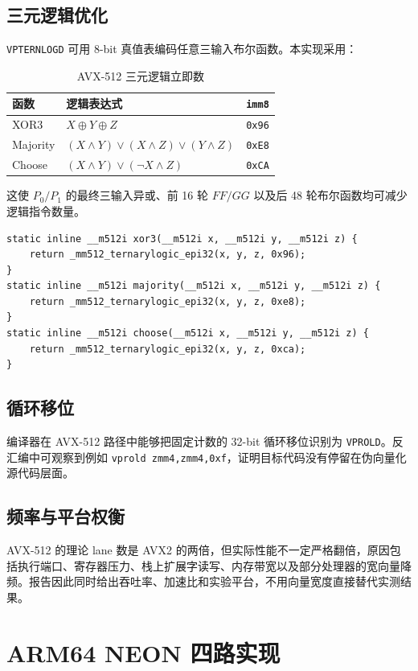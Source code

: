 \documentclass[UTF8,a4paper,12pt]{ctexart}
\newcommand{\code}[1]{\texttt{#1}}
\begin{document}
\subsection{三元逻辑优化}
\code{VPTERNLOGD} 可用 8-bit 真值表编码任意三输入布尔函数。本实现采用：
\begin{table}[H]
\centering
\caption{AVX-512 三元逻辑立即数}
\begin{tabular}{lll}
\toprule
函数 & 逻辑表达式 & \code{imm8} \\
\midrule
XOR3 & $X\oplus Y\oplus Z$ & \code{0x96} \\
Majority & $(X\land Y)\lor(X\land Z)\lor(Y\land Z)$ & \code{0xE8} \\
Choose & $(X\land Y)\lor(\neg X\land Z)$ & \code{0xCA} \\
\bottomrule
\end{tabular}
\end{table}
这使 $P_0/P_1$ 的最终三输入异或、前 16 轮 $FF/GG$ 以及后 48 轮布尔函数均可减少逻辑指令数量。

\begin{lstlisting}[style=cstyle,caption={AVX-512 三元逻辑实现}]
static inline __m512i xor3(__m512i x, __m512i y, __m512i z) {
    return _mm512_ternarylogic_epi32(x, y, z, 0x96);
}
static inline __m512i majority(__m512i x, __m512i y, __m512i z) {
    return _mm512_ternarylogic_epi32(x, y, z, 0xe8);
}
static inline __m512i choose(__m512i x, __m512i y, __m512i z) {
    return _mm512_ternarylogic_epi32(x, y, z, 0xca);
}
\end{lstlisting}

\subsection{循环移位}
编译器在 AVX-512 路径中能够把固定计数的 32-bit 循环移位识别为 \code{VPROLD}。反汇编中可观察到例如 \code{vprold zmm4,zmm4,0xf}，证明目标代码没有停留在伪向量化源代码层面。

\subsection{频率与平台权衡}
AVX-512 的理论 lane 数是 AVX2 的两倍，但实际性能不一定严格翻倍，原因包括执行端口、寄存器压力、栈上扩展字读写、内存带宽以及部分处理器的宽向量降频。报告因此同时给出吞吐率、加速比和实验平台，不用向量宽度直接替代实测结果。

\section{ARM64 NEON 四路实现}
\end{document}
